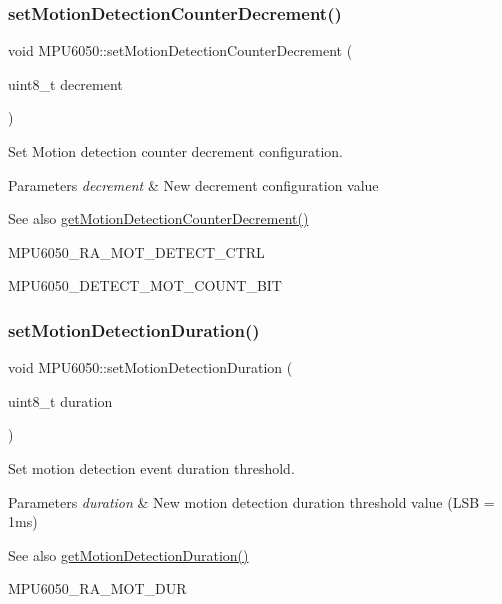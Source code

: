 \subsubsection{\texorpdfstring{setMotionDetectionCounterDecrement()}{setMotionDetectionCounterDecrement()}}
{\footnotesize\ttfamily void M\+P\+U6050\+::set\+Motion\+Detection\+Counter\+Decrement (\begin{DoxyParamCaption}\item[{uint8\+\_\+t}]{decrement }\end{DoxyParamCaption})}

Set Motion detection counter decrement configuration. 
\begin{DoxyParams}{Parameters}
{\em decrement} & New decrement configuration value \\
\hline
\end{DoxyParams}
\begin{DoxySeeAlso}{See also}
\mbox{\hyperlink{class_m_p_u6050_a0ed8de8eb440dbfdec829297527b0da6}{get\+Motion\+Detection\+Counter\+Decrement()}} 

M\+P\+U6050\+\_\+\+R\+A\+\_\+\+M\+O\+T\+\_\+\+D\+E\+T\+E\+C\+T\+\_\+\+C\+T\+RL 

M\+P\+U6050\+\_\+\+D\+E\+T\+E\+C\+T\+\_\+\+M\+O\+T\+\_\+\+C\+O\+U\+N\+T\+\_\+\+B\+IT 
\end{DoxySeeAlso}
\mbox{\label{class_m_p_u6050_a6d81616aaa47539217057891c91ff08f}} 
\subsubsection{\texorpdfstring{setMotionDetectionDuration()}{setMotionDetectionDuration()}}
{\footnotesize\ttfamily void M\+P\+U6050\+::set\+Motion\+Detection\+Duration (\begin{DoxyParamCaption}\item[{uint8\+\_\+t}]{duration }\end{DoxyParamCaption})}

Set motion detection event duration threshold. 
\begin{DoxyParams}{Parameters}
{\em duration} & New motion detection duration threshold value (L\+SB = 1ms) \\
\hline
\end{DoxyParams}
\begin{DoxySeeAlso}{See also}
\mbox{\hyperlink{class_m_p_u6050_a8ba035c2ae4a05d7e51b0d29e4924fb0}{get\+Motion\+Detection\+Duration()}} 

M\+P\+U6050\+\_\+\+R\+A\+\_\+\+M\+O\+T\+\_\+\+D\+UR 
\end{DoxySeeAlso}
\mbox{\label{class_m_p_u6050_aa23c8d66502345c30915e69975fd2cc9}} 
